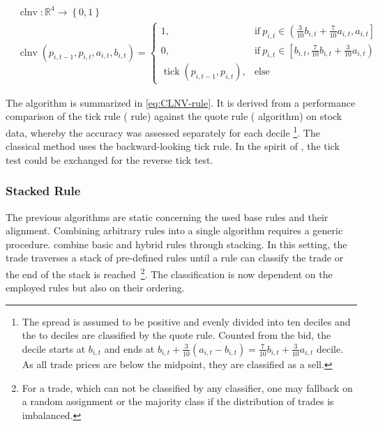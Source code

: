\begin{equation}
  \begin{aligned}
  &\operatorname{clnv} \colon \mathbb{R}^4 \to \left\{0, 1 \right\}\\
  &\operatorname{clnv}(p_{i, t-1}, p_{i, t}, a_{i, t}, b_{i, t})=
  \begin{cases}
    1,                     & \text{if}\ p_{i, t} \in \left(\frac{3}{10} b_{i,t} + \frac{7}{10} a_{i,t}, a_{i, t}\right] \\
    0,                     & \text{if}\ p_{i, t} \in \left[ b_{i,t}, \frac{7}{10} b_{i,t} + \frac{3}{10} a_{i,t}\right) \\
    \operatorname{tick}(p_{i, t-1}, p_{i, t}), & \text{else}
  \end{cases}
  \end{aligned}
  \label{eq:CLNV-rule}
\end{equation}

The algorithm is summarized in \cref{eq:CLNV-rule}. It is derived from a performance comparison of the tick rule ( rule) against the quote rule ( algorithm) on stock data, whereby the accuracy was assessed separately for each decile \footnote{The spread is assumed to be positive and evenly divided into ten deciles and the  to  deciles are classified by the quote rule. Counted from the bid, the  decile starts at $b_{i,t}$ and ends at $b_{i,t} + \tfrac{3}{10} (a_{i,t} - b_{i,t}) = \tfrac{7}{10} b_{i,t} + \tfrac{3}{10} a_{i,t}$  decile. As all trade prices are below the midpoint, they are classified as a sell.}. The classical  method uses the backward-looking tick rule. In the spirit of \textcite[][735]{leeInferringTradeDirection1991}, the tick test could be exchanged for the reverse tick test.

\subsubsection{Stacked Rule}\label{sec:stacked-rule}

The previous algorithms are static concerning the used base rules and their alignment. Combining arbitrary rules into a single algorithm requires a generic procedure. \textcite[][18]{grauerOptionTradeClassification2022} combine basic and hybrid rules through stacking. In this setting, the trade traverses a stack of pre-defined rules until a rule can classify the trade or the end of the stack is reached~\footnote{For a trade, which can not be classified by any classifier, one may fallback on a random assignment or the majority class if the distribution of trades is imbalanced.}. The classification is now dependent on the employed rules but also on their ordering.

